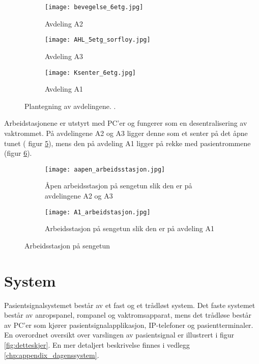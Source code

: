 \begin{figure}[H]
        \centering
        \begin{subfigure}[b]{1.0\textwidth}
        		\centering
				\texttt{[image: bevegelse\_6etg.jpg]}
				\caption{Avdeling A2}
				\label{fig:Bevegelse}
        \end{subfigure}
        
        \begin{subfigure}[b]{1.0\textwidth}
        		\centering
				\texttt{[image: AHL\_5etg\_sorfloy.jpg]}
				\caption{Avdeling A3}
				\label{fig:AHL}
        \end{subfigure}
        
        \begin{subfigure}[b]{1.0\textwidth}
        		\centering
				\texttt{[image: Ksenter\_6etg.jpg]}
				\caption{Avdeling A1}
				\label{fig:Ksenter}		
        \end{subfigure}
        \caption{Plantegning av avdelingene. \citep{sykehuskart}.}
        \label{Plantegninger}
\end{figure}

\noindent
Arbeidstasjonene er utstyrt med PC'er og fungerer som en desentralisering av vaktrommet. På avdelingene A2 og A3 ligger denne som et senter på det åpne tunet ( figur \ref{fig:aapen_arbeidsstasjon}), mens den på avdeling A1 ligger på rekke med pasientrommene (figur \ref{fig:A1_arbeidsstasjon}).

\begin{figure}[H]
\centering
	\begin{subfigure}[b]{1.0\textwidth}
		\centering
		\texttt{[image: aapen\_arbeidsstasjon.jpg]}
		\caption{Åpen arbeidsstasjon på sengetun slik den er på avdelingene A2 og A3 			\citep{sykehuskart}}
		\label{fig:aapen_arbeidsstasjon}
	\end{subfigure}
	
	\begin{subfigure}[b]{1.0\textwidth}
		\centering
		\texttt{[image: A1\_arbeidstasjon.jpg]}
		\caption{Arbeidsstasjon på sengetun slik den er på avdeling A1 							\citep{sykehuskart}}
		\label{fig:A1_arbeidsstasjon}
	\end{subfigure}
\caption{Arbeidsstasjon på sengetun}
\label{fig:arbeidsstasjon}
\end{figure}

\section{System}
Pasientsignalsystemet består av et fast og et trådløst system. Det faste systemet består av anropspanel, rompanel og vaktromsapparat, mens det trådløse består av PC'er som kjører pasientsignalapplikasjon, IP-telefoner og pasientterminaler. En overordnet oversikt over varslingen av pasientsignal er illustrert i figur \ref{fig:detteskjer}. En mer detaljert beskrivelse finnes i vedlegg \ref{chp:appendix_dagenssystem}.

